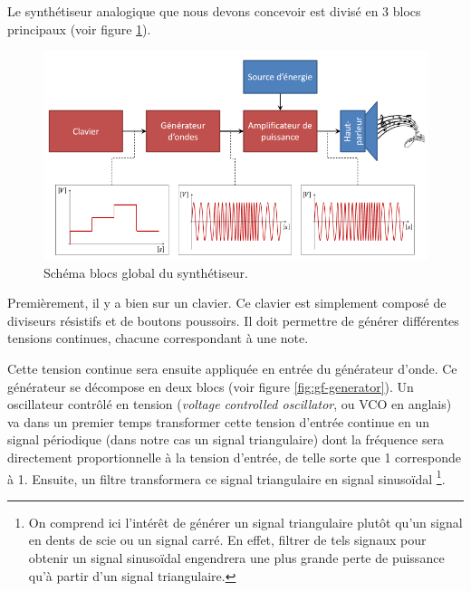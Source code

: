 

Le synthétiseur analogique que nous devons concevoir
est divisé en 3 blocs principaux (voir figure \ref{fig:gf-global}).

\begin{figure}[ht]
	\centering
	\includegraphics[scale=0.6]{img-gf/gf-global.png}
	\caption{Schéma blocs global du synthétiseur.}
	\label{fig:gf-global}
\end{figure}

Premièrement, il y a bien sur un clavier. Ce clavier est simplement
composé de diviseurs résistifs et de boutons poussoirs. Il doit
permettre de générer différentes tensions continues, chacune
correspondant à une note.

Cette tension continue sera ensuite appliquée en entrée du générateur
d'onde. Ce générateur se décompose en deux blocs (voir figure
\ref{fig:gf-generator}). Un oscillateur contrôlé en tension 
(\textit{voltage controlled oscillator}, ou VCO en anglais) va dans
un premier temps transformer cette tension d'entrée continue
en un signal périodique (dans notre cas un signal triangulaire) 
dont la fréquence sera directement proportionnelle
à la tension d'entrée, de telle sorte que
\unit{1}{\milli\volt} corresponde à \unit{1}{\hertz}. Ensuite, un filtre
transformera ce signal triangulaire en signal sinusoïdal
\footnote{On comprend ici l'intérêt de générer un signal triangulaire plutôt
qu'un signal en dents de scie ou un signal carré. En effet, filtrer
de tels signaux pour obtenir un signal sinusoïdal engendrera
une plus grande perte de puissance qu'à partir d'un signal
triangulaire.}. %

